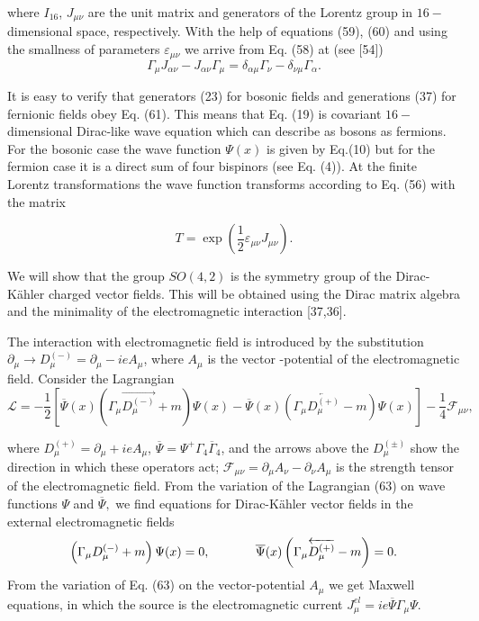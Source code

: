 \documentclass[a4paper,12pt]{article}
\begin{document}
where $I_{16}$, $J_{\mu \nu }$ are the unit matrix and generators of the
Lorentz group in $16-$dimensional space, respectively. With the help of
equations (59), (60) and using the smallness of parameters $\varepsilon
_{\mu \nu }$ we arrive from Eq. (58) at (see [54])
\begin{equation}
\Gamma _\mu J_{\alpha \nu }-J_{\alpha \nu }\Gamma _\mu =\delta
_{\alpha \mu }\Gamma _\nu -\delta _{\nu \mu }\Gamma _\alpha .
\label{61}
\end{equation}

It is easy to verify that generators (23) for bosonic fields and generations
(37) for fernionic fields obey Eq. (61). This means that Eq. (19) is
covariant $16-$dimensional Dirac-like wave equation which can describe as
bosons as fermions. For the bosonic case the wave function $\Psi (x)$ is
given by Eq.(10) but for the fermion case it is a direct sum of four
bispinors (see Eq. (4)). At the finite Lorentz transformations the wave
function transforms according to Eq. (56) with the matrix

\begin{equation}
T=\exp \left( \frac 12\varepsilon _{\mu \nu }J_{\mu \nu }\right) .
\label{62}
\end{equation}

We will show that the group $SO(4,2)$ is the symmetry group of the
Dirac-K\"ahler charged vector fields. This will be obtained using the Dirac
matrix algebra and the minimality of the electromagnetic interaction [37,36].

The interaction with electromagnetic field is introduced by the
substitution $\partial _\mu \rightarrow D_\mu ^{(-)}=\partial _\mu
-ieA_\mu $, where $ A_\mu $ is the vector -potential of the
electromagnetic field. Consider the Lagrangian
\begin{equation}
\mathcal{L}=-\frac 12\left[ \overline{\Psi }(x)\left( \Gamma _\mu
\overrightarrow{D_\mu ^{(-)}}+m\right) \Psi (x)-\overline{\Psi
}(x)\left( \Gamma _\mu \overleftarrow{D_\mu ^{(+)}}-m\right) \Psi
(x)\right] -\frac 14 \mathcal{F}_{\mu \nu } , \label{63}
\end{equation}

where $D_\mu ^{(+)}=\partial _\mu +ieA_\mu $, $\overline{\Psi }=\Psi
^{+}\Gamma _4\overline{\Gamma }_4$, and the arrows above the $D_\mu ^{(\pm
)} $ show the direction in which these operators act; $\mathcal{F}_{\mu \nu
}=\partial _\mu A_\nu -\partial _\nu A_\mu $ is the strength tensor of the
electromagnetic field. From the variation of the Lagrangian (63) on wave
functions $\Psi $ and $\overline{\Psi },$ we find equations for
Dirac-K\"ahler vector fields in the external electromagnetic fields
\begin{equation}
\left( \Gamma _\mu D_\mu ^{(-)}+m\right) \Psi (x)=0 ,
\hspace{0.5in}\overline{ \Psi }(x)\left( \Gamma _\mu
\overleftarrow{D_\mu ^{(+)}}-m\right) =0  .\label{64}
\end{equation}
From the variation of Eq. (63) on the vector-potential $A_\mu $ we get
Maxwell equations, in which the source is the electromagnetic current $J_\mu
^{el}=ie\overline{\Psi }\Gamma _\mu \Psi $.
\end{document}
